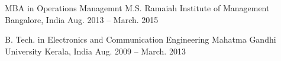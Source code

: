 

\begin{cventries}

  \cventry
    {MBA in Operations Managemnt} %
    {M.S. Ramaiah Institute of Management} %
    {Bangalore, India} %
    {Aug. 2013 – March. 2015} %
    {
      \begin{cvitems} %
      \end{cvitems}
    }

\cventry
{B. Tech. in Electronics and Communication Engineering} %
{Mahatma Gandhi University} %
{Kerala, India} %
{Aug. 2009 – March. 2013} %
{
	\begin{cvitems} %
	\end{cvitems}
}

\end{cventries}
